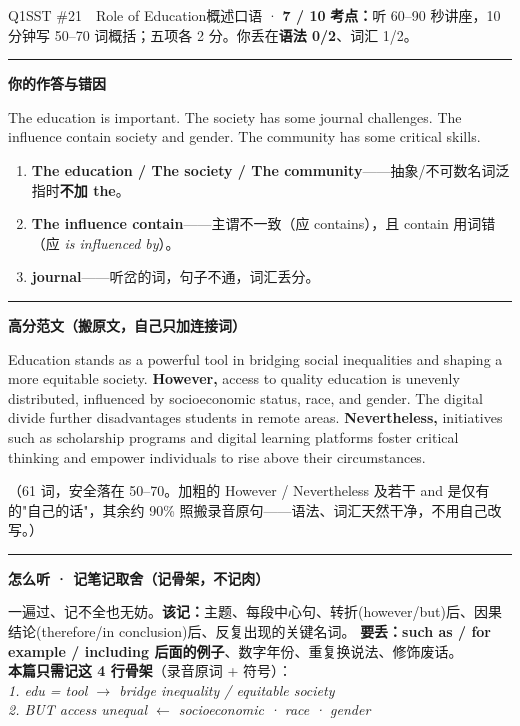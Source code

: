 \documentclass[11pt]{article}
\newcommand{\ptesub}[1]{%
  \par\needspace{2\baselineskip}\smallskip
  {\color{cAccent}\rule[-0.2ex]{3pt}{1.05em}}\hspace{6pt}%
  {\bfseries\color{cHead}#1}\par\nopagebreak\smallskip}
\begin{document}
\begin{qblock}{Q1\quad SST \#21\ \ Role of Education}{概述口语 · \textcolor{cAccent}{\bfseries 7 / 10}}
\textbf{考点：}听 60–90 秒讲座，10 分钟写 50–70 词概括；五项各 2 分。你丢在\textbf{语法 0/2}、词汇 1/2。
\ptesub{你的作答与错因}
\begin{youbox}\small
The education is important. The society has some journal challenges. The influence contain society and gender. The community has some critical skills.
\end{youbox}
\begin{enumerate}[leftmargin=1.4em,itemsep=1pt,topsep=2pt]
\item \textbf{The education / The society / The community}——抽象/不可数名词泛指时\textbf{不加 the}。
\item \textbf{The influence contain}——主谓不一致（应 contains），且 contain 用词错（应 \emph{is influenced by}）。
\item \textbf{journal}——听岔的词，句子不通，词汇丢分。
\end{enumerate}
\ptesub{高分范文（搬原文，自己只加连接词）}
\begin{modelbox}\small
Education stands as a powerful tool in bridging social inequalities and shaping a more equitable society. \textbf{However,} access to quality education is unevenly distributed, influenced by socioeconomic status, race, and gender. The digital divide further disadvantages students in remote areas. \textbf{Nevertheless,} initiatives such as scholarship programs and digital learning platforms foster critical thinking and empower individuals to rise above their circumstances.
\end{modelbox}
{\footnotesize\color{gray}（61 词，安全落在 50–70。加粗的 However / Nevertheless 及若干 and 是仅有的"自己的话"，其余约 90\% 照搬录音原句——语法、词汇天然干净，不用自己改写。）}
\ptesub{怎么听 · 记笔记取舍（记骨架，不记肉）}
\begin{notebox}\small
一遍过、记不全也无妨。\textbf{该记：}主题、每段中心句、转折(however/but)后、因果结论(therefore/in conclusion)后、反复出现的关键名词。
\textbf{要丢：}\textbf{such as / for example / including 后面的例子}、数字年份、重复换说法、修饰废话。\\[2pt]
\textbf{本篇只需记这 4 行骨架}（录音原词 + 符号）：\\
\emph{1. edu = tool $\to$ bridge inequality / equitable society}\\
\emph{2. BUT access unequal $\leftarrow$ socioeconomic · race · gender}\\

\end{notebox}
\end{qblock}
\end{document}
